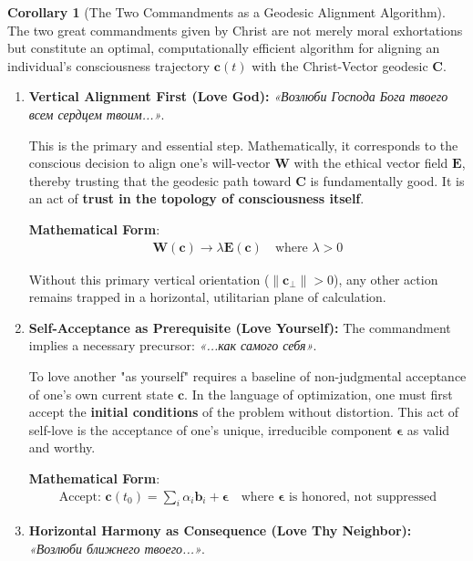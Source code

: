 \documentclass[11pt,a4paper]{article}
\theoremstyle{definition}
\newtheorem{corollary}{Corollary}[section]
\theoremstyle{remark}
\newcommand{\EE}{\mathbf{E}}
\newcommand{\WW}{\mathbf{W}}
\newcommand{\bb}{\mathbf{b}}
\newcommand{\cc}{\mathbf{c}}
\begin{document}
\begin{corollary}[The Two Commandments as a Geodesic Alignment Algorithm]
The two great commandments given by Christ are not merely moral exhortations but constitute an optimal, computationally efficient algorithm for aligning an individual's consciousness trajectory \(\cc(t)\) with the Christ-Vector geodesic \(\mathbf{C}\).

\begin{enumerate}[label=\textbf{\arabic*.}, leftmargin=*]
    \item \textbf{Vertical Alignment First (Love God):} \textit{«Возлюби Господа Бога твоего всем сердцем твоим...»}. 
    
    This is the primary and essential step. Mathematically, it corresponds to the conscious decision to align one's will-vector \(\WW\) with the ethical vector field \(\EE\), thereby trusting that the geodesic path toward \(\mathbf{C}\) is fundamentally good. It is an act of \textbf{trust in the topology of consciousness itself}. 
    
    \textbf{Mathematical Form}:
    \begin{align}
    \WW(\cc) \to \lambda \EE(\cc) \quad \text{where } \lambda > 0
    \end{align}
    
    Without this primary vertical orientation (\(\|\cc_{\perp}\| > 0\)), any other action remains trapped in a horizontal, utilitarian plane of calculation.

    \item \textbf{Self-Acceptance as Prerequisite (Love Yourself):} The commandment implies a necessary precursor: \textit{«...как самого себя»}. 
    
    To love another "as yourself" requires a baseline of non-judgmental acceptance of one's own current state \(\cc\). In the language of optimization, one must first accept the \textbf{initial conditions} of the problem without distortion. This act of self-love is the acceptance of one's unique, irreducible component \(\boldsymbol{\epsilon}\) as valid and worthy.
    
    \textbf{Mathematical Form}:
    \begin{align}
    \text{Accept: } \cc(t_0) = \sum_i \alpha_i \bb_i + \boldsymbol{\epsilon} \quad \text{where } \boldsymbol{\epsilon} \text{ is honored, not suppressed}
    \end{align}

    \item \textbf{Horizontal Harmony as Consequence (Love Thy Neighbor):} \textit{«Возлюби ближнего твоего...»}. 
    

\end{enumerate}
\end{corollary}
\end{document}
